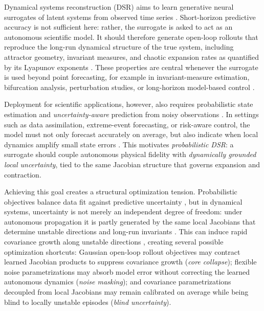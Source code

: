 \documentclass{article}
\theoremstyle{plain}
\theoremstyle{definition}
\theoremstyle{remark}
\begin{document}
Dynamical systems reconstruction (DSR) aims to learn generative neural surrogates of latent systems from observed time series \citep{durstewitz2023reconstructing,hess2023generalized,durstewitz2026position}. Short-horizon predictive accuracy is not sufficient here: rather, the surrogate is asked to act as an autonomous scientific model. It should therefore generate open-loop rollouts that reproduce the long-run dynamical structure of the true system, including attractor geometry, invariant measures, and chaotic expansion rates as quantified by its Lyapunov exponents \citep{goering2024outofdomain,botvinick-greenhouse2025invariant}. 
These properties are central whenever the surrogate is used beyond point forecasting, for example in invariant-measure estimation, bifurcation analysis, perturbation studies, or long-horizon model-based control \citep{jiang2023training,luo2024reconstructing,park2024when,schiff2024dyslim}.

Deployment for scientific applications, however, also requires probabilistic state estimation and \emph{uncertainty-aware} prediction from noisy observations \citep{gottwald2021supervised,psaros2023uncertainty}. In settings such as data assimilation, extreme-event forecasting, or risk-aware control, the model must not only forecast accurately on average, but also indicate when local dynamics amplify small state errors \citep{reich2015probabilistic,trevisan2011kalman}. This motivates \emph{probabilistic DSR}: a surrogate should couple autonomous physical fidelity with \emph{dynamically grounded local uncertainty}, tied to the same Jacobian structure that governs expansion and contraction.

Achieving this goal creates a structural
optimization tension. Probabilistic objectives balance data fit against predictive uncertainty \citep{mackay1992bayesian,rasmussen2006gaussian}, but in dynamical systems, uncertainty is not merely an independent degree of freedom: under autonomous propagation it is partly generated by the
same local Jacobians that determine unstable directions and long-run invariants
\citep{eckmann1985ergodic}. This can induce rapid covariance growth along unstable directions \citep{trevisan2011kalman, carrassi2022data}, creating several possible optimization shortcuts: Gaussian open-loop rollout objectives may contract learned Jacobian products to suppress covariance growth (\emph{core collapse}); flexible noise parametrizations may absorb model error without correcting the learned autonomous dynamics (\emph{noise masking}); and covariance parametrizations decoupled from local Jacobians may remain calibrated on average while being blind to locally unstable episodes (\emph{blind uncertainty}).
\end{document}
